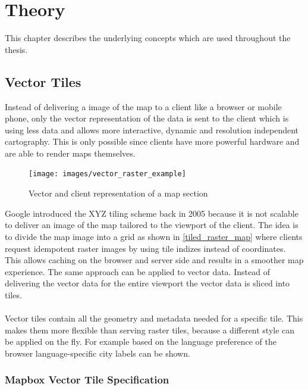 \chapter{Theory}

This chapter describes the underlying concepts which are used throughout the thesis. 

\section{Vector Tiles}\label{part1_vector_tiles}

Instead of delivering a image of the map to a client like a browser or mobile phone, only the vector representation of the data is sent to the client which is using less data and allows more interactive, dynamic  and resolution independent cartography. This is only possible since clients have more powerful hardware and are able to render maps themselves.

\begin{figure}[H]
\centering
\texttt{[image: images/vector\_raster\_example]}
\caption{Vector and client representation of a map section}
\end{figure}
    
    Google introduced the XYZ tiling scheme \cite{v_1_wiki.openstreetmap.org_2015} back in 2005 because it is not scalable to deliver an image of the map tailored to the viewport of the client.
    The idea is to divide the map image into a grid as shown in \autoref{tiled_raster_map} where clients request idempotent raster images by using tile indizes instead of coordinates. This allows caching on the browser and server side and results in a smoother map experience.
    The same approach can be applied to vector data. Instead of delivering the vector data for the entire viewport the vector data is sliced into tiles.\\\\
    Vector tiles contain all the geometry and metadata needed for a specific tile. This makes them more flexible than serving raster tiles, because a different style can be applied on the fly. For example based on the language preference of the browser language-specific city labels can be shown.

\subsection*{Mapbox Vector Tile Specification}\label{part1_vector_tile_specification}


